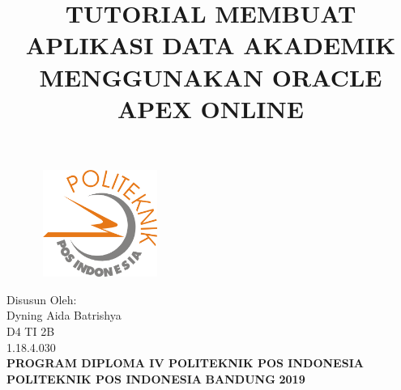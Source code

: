 \documentclass[a4paper, 12pt]{article}
\begin{document}
\title{\textbf{TUTORIAL MEMBUAT APLIKASI DATA AKADEMIK MENGGUNAKAN ORACLE APEX ONLINE}}
\date{}

\maketitle

\begin{figure}[!ht]
\begin{center}
\includegraphics[width = 4cm, height = 3.5cm]{gambar/logo.png}
\end{center}
\end{figure}

\begin{center}
\vspace{1cm}
Disusun Oleh:\\
Dyning Aida Batrishya\\
D4 TI 2B\\
1.18.4.030\\
\vspace{1cm}
\textbf{PROGRAM DIPLOMA IV POLITEKNIK POS INDONESIA} \linebreak
\textbf{POLITEKNIK POS INDONESIA} \linebreak
\textbf{BANDUNG}\linebreak
\textbf{2019}

\end{center}

\thispagestyle{empty}


\end{document}
